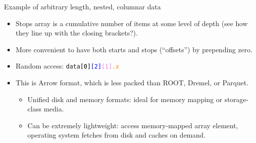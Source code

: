 \documentclass[aspectratio=169]{beamer}
\begin{document}
\begin{frame}{Example of arbitrary length, nested, columnar data}
\vspace{0.25 cm}
\begin{itemize}
\item<3-> Stops array is a cumulative number of items at some level of depth (see how they line up with the closing brackets?).
\item<4-> More convenient to have both starts and stops (``offsets'') by prepending zero.
\item<5-> Random access: {\tt\small data\textcolor{black}{[0]}\textcolor{blue}{[2]}\textcolor{violet}{[1]}\textcolor{darkorange}{.x}} 
\item<7-> This is Arrow format, which is less packed than ROOT, Dremel, or Parquet.
\begin{itemize}
\item<8-> Unified disk and memory formats: ideal for memory mapping or storage-class media.
\item<9-> Can be extremely lightweight: access memory-mapped array element, operating system fetches from disk and caches on demand.
\end{itemize}
\end{itemize}
\end{frame}

\begin{frame}{}

\end{frame}
\end{document}
